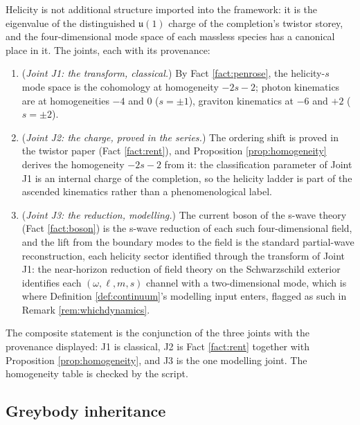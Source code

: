 \begin{assembly}\label{asm:helicity}
Helicity is not additional structure imported into the framework: it is the eigenvalue of the distinguished $\mathfrak{u}(1)$ charge of the completion's twistor storey, and the four-dimensional mode space of each massless species has a canonical place in it. The joints, each with its provenance:
\begin{enumerate}
\item (\emph{Joint J1: the transform, classical.}) By Fact \ref{fact:penrose}, the helicity-$s$ mode space is the cohomology at homogeneity $-2s-2$; photon kinematics are at homogeneities $-4$ and $0$ ($s = \pm1$), graviton kinematics at $-6$ and $+2$ ($s = \pm2$).
\item (\emph{Joint J2: the charge, proved in the series.}) The ordering shift is proved in the twistor paper (Fact \ref{fact:rent}), and Proposition \ref{prop:homogeneity} derives the homogeneity $-2s-2$ from it: the classification parameter of Joint J1 is an internal charge of the completion, so the helicity ladder is part of the ascended kinematics rather than a phenomenological label.
\item (\emph{Joint J3: the reduction, modelling.}) The current boson of the s-wave theory (Fact \ref{fact:boson}) is the s-wave reduction of each such four-dimensional field, and the lift from the boundary modes to the field is the standard partial-wave reconstruction, each helicity sector identified through the transform of Joint J1: the near-horizon reduction of field theory on the Schwarzschild exterior identifies each $(\omega, \ell, m, s)$ channel with a two-dimensional mode, which is where Definition \ref{def:continuum}'s modelling input enters, flagged as such in Remark \ref{rem:whichdynamics}.
\end{enumerate}
The composite statement is the conjunction of the three joints with the provenance displayed: J1 is classical, J2 is Fact \ref{fact:rent} together with Proposition \ref{prop:homogeneity}, and J3 is the one modelling joint. The homogeneity table is checked by the script.
\end{assembly}

\subsection{Greybody inheritance}\label{subsec:greybody}

